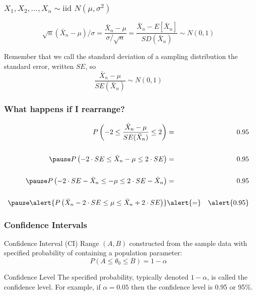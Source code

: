 \begin{frame}
  \frametitle{$X_1, X_2, \hdots, X_n \sim \mbox{iid } N(\mu,\sigma^2)$}

	$$\sqrt{n}(\bar{X}_n - \mu)/\sigma =  \frac{\bar{X}_n - \mu}{\sigma/\sqrt{n}} =  \frac{\bar{X}_n - E[\bar{X}_n]}{SD(\bar{X}_n)}  \sim N(0,1)$$

  \vspace{1em}
Remember that we call the standard deviation of a sampling distribution the \alert{standard error}, written $SE$, so $$\frac{\bar{X}_n - \mu}{SE(\bar{X}_n)} \sim N(0,1)$$
\end{frame}
%
%
%
\begin{frame}
\frametitle{What happens if I rearrange?}
	\begin{eqnarray*}
		P\left(-2 \leq \frac{\bar{X}_n - \mu}{SE(\bar{X}_n)} \leq 2 \right) &=& 0.95\\ \\ \pause
			P\left(-2\cdot SE\leq \bar{X}_n - \mu \leq 2 \cdot SE\right) &=& 0.95\\ \\ \pause
			P\left(-2\cdot SE - \bar{X}_n \leq - \mu \leq 2 \cdot SE - \bar{X}_n \right) &=& 0.95\\ \\ \pause
			\alert{P\left( \bar{X}_n - 2\cdot SE \leq \mu \leq \bar{X}_n + 2\cdot SE \right)}&\alert{=}& \alert{0.95}
	\end{eqnarray*}

\end{frame}



\begin{frame}
\frametitle{Confidence Intervals}

\begin{block}{Confidence Interval (CI)}
Range $(A,B)$ constructed from the \alert{sample data} with specified probability of containing a \alert{population parameter}:
	$$P(A \leq \theta_0 \leq B) = 1-\alpha$$
\end{block} 

\pause

\begin{block}{Confidence Level}
The \alert{specified probability}, typically denoted $1-\alpha$, is called the confidence level. For example, if $\alpha = 0.05$ then the confidence level is 0.95 or 95\%.
\end{block}
\end{frame}
